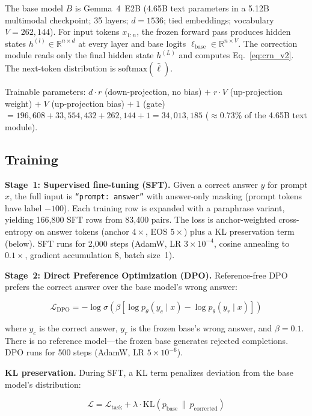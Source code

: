 \documentclass[11pt]{article}
\begin{document}
The base model $B$ is Gemma~4~E2B (4.65B text parameters in a 5.12B multimodal checkpoint; 35 layers; $d{=}1536$; tied embeddings; vocabulary $V{=}262{,}144$).
For input tokens $x_{1:n}$, the frozen forward pass produces hidden states $h^{(l)} \in \mathbb{R}^{n \times d}$ at every layer and base logits $\ell_{\text{base}} \in \mathbb{R}^{n \times V}$.
The correction module reads only the final hidden state $h^{(L)}$ and computes Eq.~\ref{eq:crn_v2}.
The next-token distribution is $\text{softmax}(\hat{\ell})$.

Trainable parameters: $d{\cdot}r$ (down-projection, no bias) $+\; r{\cdot}V$ (up-projection weight) $+\; V$ (up-projection bias) $+\; 1$ (gate) $= 196{,}608 + 33{,}554{,}432 + 262{,}144 + 1 = 34{,}013{,}185$ ($\approx$0.73\% of the 4.65B text module).

\subsection{Training}
\label{sec:training}

\textbf{Stage~1: Supervised fine-tuning (SFT).}
Given a correct answer $y$ for prompt $x$, the full input is \texttt{``prompt: answer''} with answer-only masking (prompt tokens have label $-100$).
Each training row is expanded with a paraphrase variant, yielding 166{,}800 SFT rows from 83{,}400 pairs.
The loss is anchor-weighted cross-entropy on answer tokens (anchor $4\times$, EOS $5\times$) plus a KL preservation term (below).
SFT runs for 2{,}000 steps (AdamW, LR $3{\times}10^{-4}$, cosine annealing to $0.1\times$, gradient accumulation 8, batch size~1).

\textbf{Stage~2: Direct Preference Optimization (DPO).}
Reference-free DPO~\cite{rafailov2023dpo} prefers the correct answer over the base model's wrong answer:

\begin{equation}
\mathcal{L}_{\text{DPO}} = -\log \sigma\!\left(\beta \left[\log p_\theta(y_c \mid x) - \log p_\theta(y_r \mid x)\right]\right)
\end{equation}

where $y_c$ is the correct answer, $y_r$ is the frozen base's wrong answer, and $\beta{=}0.1$.
There is no reference model---the frozen base generates rejected completions.
DPO runs for 500 steps (AdamW, LR $5{\times}10^{-6}$).

\textbf{KL preservation.}
During SFT, a KL term penalizes deviation from the base model's distribution:

\begin{equation}
\mathcal{L} = \mathcal{L}_{\text{task}} + \lambda \cdot \text{KL}(p_{\text{base}} \,\|\, p_{\text{corrected}})
\end{equation}
\end{document}
